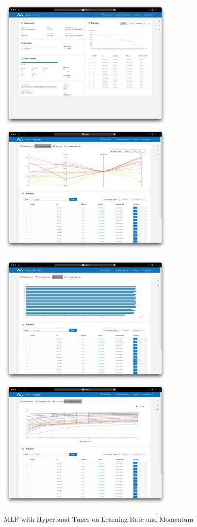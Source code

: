 \documentclass{article}
\begin{document}
\begin{figure}
    \centerline{\includegraphics[width=3.5in]{../proj3/figures/mlp_hyperband_overview.png}\includegraphics[width=3.5in]{../proj3/figures/mlp_hyperband_hyperparameter.png}}
    \centerline{\includegraphics[width=3.5in]{../proj3/figures/mlp_hyperband_latency.png}\includegraphics[width=3.5in]{../proj3/figures/mlp_hyperband_intermediate.png}}
    \caption{MLP with Hyperband Tuner on Learning Rate and Momentum}
    \label{fig:mlp-hyperband}
\end{figure}
\end{document}
